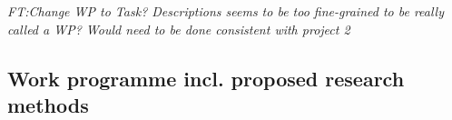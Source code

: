 \documentclass[11pt]{article}
\providecommand{\currfilename}{}
\newcommand{\showfile}{{\bf \tt \color{blue} \currfilename}}
\newcommand{\note}[1]{{\it \color{red} #1}}
\newcommand{\noteft}[1]{{\it \color{magenta} FT:#1}}
\newcommand{\note}[1]{}
\newcommand{\noteft}[1]{}
\newcommand{\showfile}{}
\begin{document}
% 



\noteft{Change WP to Task?  Descriptions seems to be too fine-grained to be really called a WP? Would need to be done consistent with project 2}
\subsection{Work programme incl. proposed research methods}
\\
\showfile
\noindent
% 
% 
% 
\end{document}
